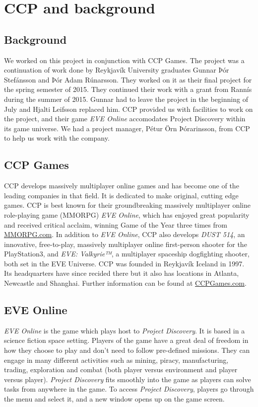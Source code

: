 \section{CCP and background}\label{sec:ccp}

\subsection{Background}

We worked on this project in conjunction with CCP Games. The project was a continuation of work done by Reykjavík University graduates Gunnar Þór Stefánsson and Þór Adam Rúnarsson. They worked on it as their final project for the spring semester of 2015. They continued their work with a grant from Rannís during the summer of 2015. Gunnar had to leave the project in the beginning of July and Hjalti Leifsson replaced him. CCP provided us with facilities to work on the project, and their game \emph{EVE Online} accomodates Project Discovery within its game universe. We had a project manager, Pétur Örn Þórarinsson, from CCP to help us work with the company. 

\subsection{CCP Games}

CCP develops massively multiplayer online games and has become one of the leading companies in that field. It is dedicated to make original, cutting edge games. CCP is best known for their groundbreaking massively multiplayer online role-playing game (MMORPG) \emph{EVE Online}, which has enjoyed great popularity and received critical acclaim, winning Game of the Year three times from \href{http://www.mmorpg.com/}{MMORPG.com}. In addition to \emph{EVE Online}, CCP also develops \emph{DUST 514\textsuperscript{\textregistered}}, an innovative, free-to-play, massively multiplayer online first-person shooter for the PlayStation\textsuperscript{\textregistered}3, and \emph{EVE: Valkyrie™}, a multiplayer spaceship dogfighting shooter, both set in the EVE Universe. CCP was founded in Reykjavík Iceland in 1997. Its headquarters have since recided there but it also has locations in Atlanta, Newcastle and Shanghai. Further information can be found at \href{http://www.ccpgames.com/}{CCPGames.com}.

\subsection{EVE Online}
\emph{EVE Online} is the game which plays host to \emph{Project Discovery}. It is based in a science fiction space setting. Players of the game have a great deal of freedom in how they choose to play and don't need to follow pre-defined missions. They can engage in many different activities such as mining, piracy, manufacturing, trading, exploration and combat (both player versus environment and player versus player). \emph{Project Discovery} fits smoothly into the game as players can solve tasks from anywhere in the game. To access \emph{Project Discovery}, players go through the menu and select it, and a new window opens up on the game screen.
